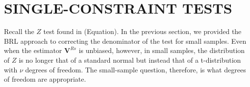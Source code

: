 \documentclass[12pt]{article}
\newcommand{\bm}{\mathbf}
\newcommand{\bs}{\boldsymbol}
\begin{document}
\section{SINGLE-CONSTRAINT TESTS}
\label{sec:testing}



Recall the $Z$ test found in (Equation). In the previous section, we provided the BRL approach to correcting the denominator of the test for small samples. Even when the estimator $\bm{V}^{Rs}$ is unbiased, however, in small samples, the distribution of $Z$ is no longer that of a standard normal but instead that of a t-distribution with $\nu$ degrees of freedom. The small-sample question, therefore, is what degrees of freedom are appropriate. 
\end{document}

